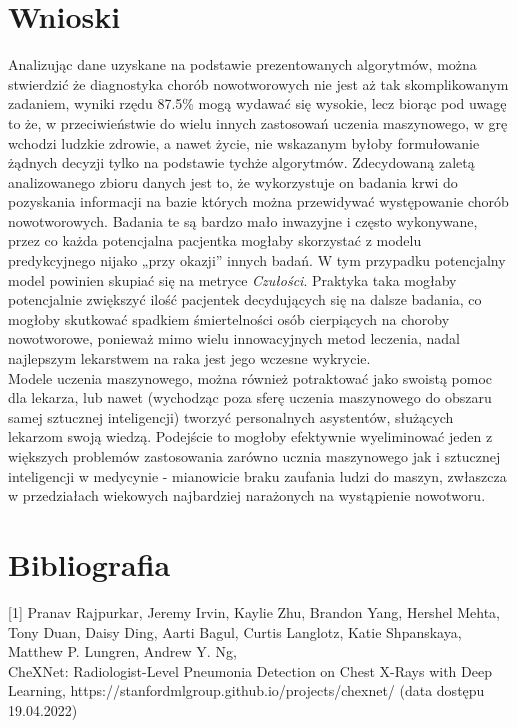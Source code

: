 \documentclass[a4paper,12pt,oneside]{book}
\begin{document}
\chapter{Wnioski}
Analizując dane uzyskane na podstawie prezentowanych algorytmów, można stwierdzić że diagnostyka chorób nowotworowych nie jest aż tak skomplikowanym zadaniem, wyniki rzędu 87.5\% mogą wydawać się wysokie, lecz biorąc pod uwagę to że, w przeciwieństwie do wielu innych zastosowań uczenia maszynowego, w grę wchodzi ludzkie zdrowie, a nawet życie, nie wskazanym byłoby formułowanie żądnych decyzji tylko na podstawie tychże algorytmów.
Zdecydowaną zaletą analizowanego zbioru danych jest to, że wykorzystuje on badania krwi do pozyskania informacji na bazie których można przewidywać występowanie chorób nowotworowych. Badania te są bardzo mało inwazyjne i często wykonywane, przez co każda potencjalna pacjentka mogłaby skorzystać z modelu predykcyjnego nijako „przy okazji” innych badań. W tym przypadku potencjalny model powinien skupiać się na metryce \textit{Czułości}. Praktyka taka mogłaby potencjalnie zwiększyć ilość pacjentek decydujących się na dalsze badania, co mogłoby skutkować spadkiem śmiertelności osób cierpiących na choroby nowotworowe, ponieważ mimo wielu innowacyjnych metod leczenia, nadal najlepszym lekarstwem na raka jest jego wczesne wykrycie.\\
Modele uczenia maszynowego, można również potraktować jako swoistą pomoc dla lekarza, lub nawet (wychodząc poza sferę uczenia maszynowego do obszaru samej sztucznej inteligencji) tworzyć personalnych asystentów, służących lekarzom swoją wiedzą. Podejście to mogłoby efektywnie wyeliminować jeden z większych problemów zastosowania zarówno ucznia maszynowego jak i sztucznej inteligencji w medycynie - mianowicie braku zaufania ludzi do maszyn, zwłaszcza w przedziałach wiekowych najbardziej narażonych na wystąpienie nowotworu.


\listoffigures{}


\lstlistoflistings{}

\markboth{}{}


\chapter*{Bibliografia}

\thispagestyle{empty}
[1] Pranav Rajpurkar, Jeremy Irvin, Kaylie Zhu, Brandon Yang, Hershel Mehta, Tony Duan, Daisy Ding, Aarti Bagul, Curtis Langlotz, Katie Shpanskaya, Matthew P. Lungren, Andrew Y. Ng,\\
CheXNet: Radiologist-Level Pneumonia Detection on Chest X-Rays with Deep Learning, https://stanfordmlgroup.github.io/projects/chexnet/ (data dostępu 19.04.2022)\\
\end{document}
